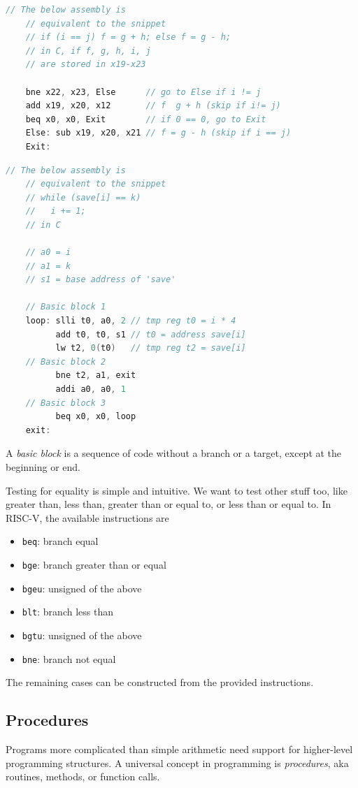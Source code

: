 \begin{lstlisting}[language=C, caption={Conditional Example}]
    // The below assembly is 
    // equivalent to the snippet
    // if (i == j) f = g + h; else f = g - h;
    // in C, if f, g, h, i, j
    // are stored in x19-x23

    bne x22, x23, Else      // go to Else if i != j
    add x19, x20, x12       // f  g + h (skip if i!= j)
    beq x0, x0, Exit        // if 0 == 0, go to Exit
    Else: sub x19, x20, x21 // f = g - h (skip if i == j)
    Exit:
\end{lstlisting}

\begin{lstlisting}[language=C, caption={Loop Example}]
    // The below assembly is 
    // equivalent to the snippet
    // while (save[i] == k)
    //   i += 1;
    // in C

    // a0 = i
    // a1 = k
    // s1 = base address of 'save'

    // Basic block 1
    loop: slli t0, a0, 2 // tmp reg t0 = i * 4
          add t0, t0, s1 // t0 = address save[i]
          lw t2, 0(t0)   // tmp reg t2 = save[i]
    // Basic block 2
          bne t2, a1, exit
          addi a0, a0, 1
    // Basic block 3
          beq x0, x0, loop
    exit:
\end{lstlisting}

A \emph{basic block} is a sequence of
code without a branch or a target,
except at the beginning or end.

Testing for equality is simple and
intuitive. We want to test other
stuff too, like greater than, less than,
greater than or equal to, or
less than or equal to. In RISC-V,
the available instructions are
\begin{itemize}
    \item \texttt{beq}: branch equal
    \item \texttt{bge}: branch greater than or equal
    \item \texttt{bgeu}: unsigned of the above
    \item \texttt{blt}: branch less than
    \item \texttt{bgtu}: unsigned of the above
    \item \texttt{bne}: branch not equal
\end{itemize}
The remaining cases can be constructed
from the provided instructions.

\subsection{Procedures}
Programs more complicated than simple arithmetic need
support for higher-level programming structures. A
universal concept in programming is \emph{procedures},
aka routines, methods, or function calls.

